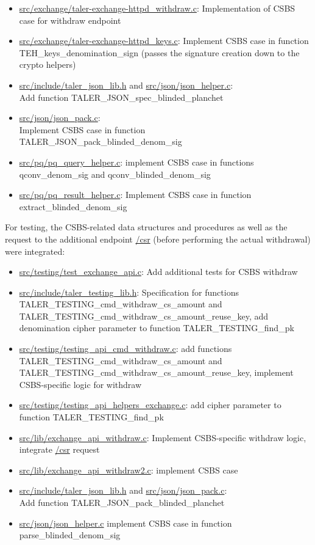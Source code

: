 \begin{itemize}
    \item \url{src/exchange/taler-exchange-httpd_withdraw.c}: Implementation of \gls{CSBS} case for withdraw endpoint
    \item \url{src/exchange/taler-exchange-httpd_keys.c}: Implement \gls{CSBS} case in function \\
    TEH\_keys\_denomination\_sign (passes the signature creation down to the crypto helpers)
    \item \url{src/include/taler_json_lib.h} and \url{src/json/json_helper.c}: \\
    Add function TALER\_JSON\_spec\_blinded\_planchet
    \item \url{src/json/json_pack.c}: \\
    Implement \gls{CSBS} case in function\\ TALER\_JSON\_pack\_blinded\_denom\_sig
    \item \url{src/pq/pq_query_helper.c}: implement \gls{CSBS} case in functions qconv\_denom\_sig and qconv\_blinded\_denom\_sig
    \item \url{src/pq/pq_result_helper.c}: Implement \gls{CSBS} case in function extract\_blinded\_denom\_sig
\end{itemize}

For testing, the \gls{CSBS}-related data structures and procedures as well as the request to the additional endpoint \url{/csr} (before performing the actual withdrawal) were integrated:
\begin{itemize}
    \item \url{src/testing/test_exchange_api.c}: Add additional tests for \gls{CSBS} withdraw
    \item \url{src/include/taler_testing_lib.h}: Specification for functions \\
    TALER\_TESTING\_cmd\_withdraw\_cs\_amount and \\
    TALER\_TESTING\_cmd\_withdraw\_cs\_amount\_reuse\_key, add denomination cipher parameter to function TALER\_TESTING\_find\_pk
    \item \url{src/testing/testing_api_cmd_withdraw.c}: add functions \\
    TALER\_TESTING\_cmd\_withdraw\_cs\_amount and \\
    TALER\_TESTING\_cmd\_withdraw\_cs\_amount\_reuse\_key, implement \gls{CSBS}-specific logic for withdraw
    \item \url{src/testing/testing_api_helpers_exchange.c}:
    add cipher parameter to function TALER\_TESTING\_find\_pk
    \item \url{src/lib/exchange_api_withdraw.c}: Implement \gls{CSBS}-specific withdraw logic, integrate \url{/csr} request
    \item \url{src/lib/exchange_api_withdraw2.c}: implement \gls{CSBS} case
    \item \url{src/include/taler_json_lib.h} and \url{src/json/json_pack.c}: \\
    Add function TALER\_JSON\_pack\_blinded\_planchet
    \item \url{src/json/json_helper.c} implement \gls{CSBS} case in function parse\_blinded\_denom\_sig
\end{itemize}

